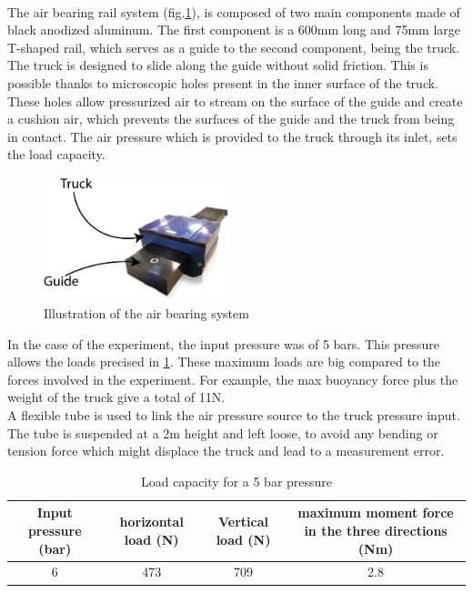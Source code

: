 \paragraph{}
The air bearing rail system (fig.\ref{fig:pic_frictionless}), is composed of two main components made of black anodized aluminum. The first component is a 600mm long and 75mm large T-shaped rail, which serves as a guide to the second component, being the truck. The truck is designed to slide along the guide without solid friction. This is possible thanks to microscopic holes present in the inner surface of the truck. These holes allow pressurized air to stream on the surface of the guide and create a cushion air, which prevents the surfaces of the guide and the truck from being in contact. The air pressure which is provided to the truck through its inlet, sets the load capacity.
\begin{figure}[H] %
	\centering%
	\includegraphics[width=0.48\textwidth]{figures/Chapter_1/Airbearing.png}
	\caption{Illustration of the air bearing system}
	\label{fig:pic_frictionless}
\end{figure}
In the case of the experiment, the input pressure was of 5 bars. This pressure allows the loads precised in \ref{tab:pressure_truck}. These maximum loads are big compared to the forces involved in the experiment. For example, the max buoyancy force plus the weight of the truck give a total of 11N.\\
A flexible tube is used to link the air pressure source to the truck pressure input. The tube is suspended at a 2m height and left loose, to avoid any bending or tension force which might displace the truck and lead to a measurement error.
\begin{table}[H]
	\centering
		\begin{adjustbox}{width=\textwidth}
			\begin{tabular}{|c|c|c|c|}
				\hline
				Input pressure (bar) & horizontal load (N)&Vertical load (N)& maximum moment force in the three directions (Nm) \\
				\hline
				6&473&709&2.8\\
				\hline
			\end{tabular}
		\end{adjustbox}
	\caption{Load capacity for a 5 bar pressure}
	\label{tab:pressure_truck}
\end{table}
